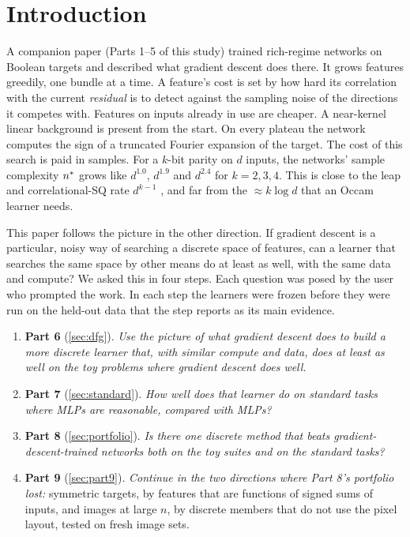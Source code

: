 \section{Introduction}\label{sec:intro}

A companion paper \cite{gdcircuit2026} (Parts 1--5 of this study) trained rich-regime networks on Boolean targets and described what gradient descent does there. It grows features greedily, one bundle at a time. A feature's cost is set by how hard its correlation with the current \emph{residual} is to detect against the sampling noise of the directions it competes with. Features on inputs already in use are cheaper. A near-kernel linear background is present from the start. On every plateau the network computes the sign of a truncated Fourier expansion of the target. The cost of this search is paid in samples. For a $k$-bit parity on $d$ inputs, the networks' sample complexity $n^{*}$ grows like $d^{1.0}$, $d^{1.9}$ and $d^{2.4}$ for $k=2,3,4$. This is close to the leap and correlational-SQ rate $d^{k-1}$ \cite{abbe2022msp,abbe2023leap}, and far from the $\approx k\log d$ that an Occam learner needs.

This paper follows the picture in the other direction. If gradient descent is a particular, noisy way of searching a discrete space of features, can a learner that searches the same space by other means do at least as well, with the same data and compute? We asked this in four steps. Each question was posed by the user who prompted the work. In each step the learners were frozen before they were run on the held-out data that the step reports as its main evidence.

\begin{enumerate}
\item \textbf{Part 6} (\cref{sec:dfg}). \emph{Use the picture of what gradient descent does to build a more discrete learner that, with similar compute and data, does at least as well on the toy problems where gradient descent does well.}
\item \textbf{Part 7} (\cref{sec:standard}). \emph{How well does that learner do on standard tasks where MLPs are reasonable, compared with MLPs?}
\item \textbf{Part 8} (\cref{sec:portfolio}). \emph{Is there one discrete method that beats gradient-descent-trained networks both on the toy suites and on the standard tasks?}
\item \textbf{Part 9} (\cref{sec:part9}). \emph{Continue in the two directions where Part 8's portfolio lost:} symmetric targets, by features that are functions of signed sums of inputs, and images at large $n$, by discrete members that do not use the pixel layout, tested on fresh image sets.
\end{enumerate}

